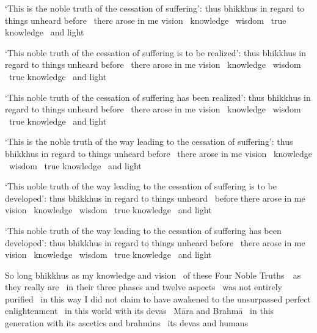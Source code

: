 \begin{english-only-hang}
  `This is the noble truth of the cessation of suffering': thus bhikkhus in regard to things unheard before \breathmark\ there arose in me vision \breathmark\ knowledge \breathmark\ wisdom \breathmark\ true knowledge \breathmark\ and light
\end{english-only-hang}

\begin{english-only-hang}
  `This noble truth of the cessation of suffering is to be realized': thus bhikkhus  in regard to things unheard before \breathmark\ there arose in me vision \breathmark\ knowledge \breathmark\ wisdom \breathmark\ true knowledge \breathmark\ and light
\end{english-only-hang}

\begin{english-only-hang}
  `This noble truth of the cessation of suffering has been realized': thus bhikkhus  in regard to things unheard before \breathmark\ there arose in me vision \breathmark\ knowledge \breathmark\ wisdom \breathmark\ true knowledge \breathmark\ and light
\end{english-only-hang}

\begin{english-only-hang}
  `This is the noble truth of the way leading to the cessation of suffering': thus bhikkhus  in regard to things unheard before \breathmark\ there arose in me vision \breathmark\ knowledge \breathmark\ wisdom \breathmark\ true knowledge \breathmark\ and light
\end{english-only-hang}

\begin{english-only-hang}
  `This noble truth of the way leading to the cessation of suffering is to be developed': thus bhikkhus  in regard to things unheard \breathmark\ before there arose in me vision \breathmark\ knowledge \breathmark\ wisdom \breathmark\ true knowledge \breathmark\ and light
\end{english-only-hang}

\begin{english-only-hang}
  `This noble truth of the way leading to the cessation of suffering has been developed': thus bhikkhus  in regard to things unheard before \breathmark\ there arose in me vision \breathmark\ knowledge \breathmark\ wisdom \breathmark\ true knowledge \breathmark\ and light
\end{english-only-hang}

\begin{english-only-hang}
  So long bhikkhus as my knowledge and vision \breathmark\ of these Four Noble \mbox{Truths}~\breathmark\ as they really are \breathmark\ in their three phases and twelve aspects \breathmark\ was not entirely purified \breathmark\ in this way I did not claim to have awakened to the unsurpassed perfect enlightenment \breathmark\ in this world with its devas \breathmark\ Māra and Brahmā \breathmark\ in this generation with its ascetics and brahmins \breathmark\ its devas and humans
\end{english-only-hang}

